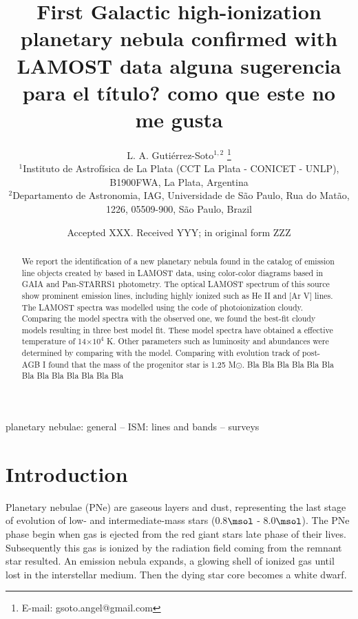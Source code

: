 \documentclass[fleqn,usenatbib]{mnras}
\title[New high-ionization planetary nebula]{First Galactic high-ionization planetary nebula confirmed with LAMOST data {\sc alguna sugerencia para el título? como que este no me gusta}}
\author[Guti\'errez-Soto et al.]{
  L. A. Guti\'errez-Soto$^{1,2}$
  \thanks{E-mail: gsoto.angel@gmail.com}
\\
$^{1}$Instituto de Astrof\'{i}sica de La Plata (CCT La Plata - CONICET - UNLP), B1900FWA, La Plata, Argentina\\
$^{2}$Departamento de Astronomia, IAG, Universidade de S\~{a}o Paulo, Rua do Mat\~{a}o, 1226, 05509-900, S\~{a}o Paulo, Brazil\\
}
\date{Accepted XXX. Received YYY; in original form ZZZ}
\begin{document}
\label{firstpage}
\pagerange{\pageref{firstpage}--\pageref{lastpage}}
\maketitle

\begin{abstract}
  We report the identification of a new planetary nebula found in the catalog of
  emission line objects created by \citet{Skoda:2020} based in LAMOST data, using
  color-color diagrams based in GAIA and Pan-STARRS1 photometry. The optical LAMOST
  spectrum of this source show prominent emission lines, including highly ionized
  such as He II and [Ar V] lines. The LAMOST spectra was
  modelled using the code of photoionization  {\sc cloudy}.
  Comparing the model spectra with the observed one, we found
  the best-fit {\sc cloudy} models resulting in three best model fit.
  These model spectra have obtained a effective temperature of 14$\times10^{4}$ K.
  Other parameters such as luminosity and abundances were determined by
  comparing with the model. Comparing with evolution track of post-AGB
  I found that the mass of the progenitor star is 1.25 M{$\odot$}. {\sc Bla Bla Bla Bla
  Bla Bla Bla Bla Bla Bla Bla Bla Bla}
\end{abstract}

\begin{keywords}
planetary nebulae: general -- ISM: lines and bands -- surveys
\end{keywords}



\section{Introduction}

\label{sec:intro}

Planetary nebulae (PNe) are gaseous layers and dust, representing the last stage of
evolution of low- and intermediate-mass stars (0.8$\msol$ - 8.0$\msol$).
The PNe phase begin when gas is ejected from the red giant stars late phase of
their lives. Subsequently this gas is ionized by the radiation field coming from the remnant
star resulted. An emission nebula expands, a glowing shell of ionized gas until lost in the
interstellar medium. Then the dying star core becomes a white dwarf.
\end{document}
